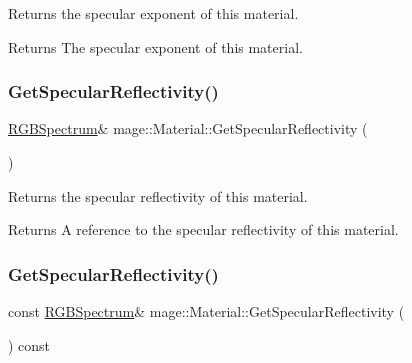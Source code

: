 Returns the specular exponent of this material.

\begin{DoxyReturn}{Returns}
The specular exponent of this material. 
\end{DoxyReturn}
\hypertarget{structmage_1_1_material_ad5fde8d972471fc99b72a4fc969883b1}{}\label{structmage_1_1_material_ad5fde8d972471fc99b72a4fc969883b1} 
\subsubsection{\texorpdfstring{Get\+Specular\+Reflectivity()}{GetSpecularReflectivity()}\hspace{0.1cm}{\footnotesize\ttfamily [1/2]}}
{\footnotesize\ttfamily \hyperlink{structmage_1_1_r_g_b_spectrum}{R\+G\+B\+Spectrum}\& mage\+::\+Material\+::\+Get\+Specular\+Reflectivity (\begin{DoxyParamCaption}{ }\end{DoxyParamCaption})\hspace{0.3cm}{\ttfamily [noexcept]}}

Returns the specular reflectivity of this material.

\begin{DoxyReturn}{Returns}
A reference to the specular reflectivity of this material. 
\end{DoxyReturn}
\hypertarget{structmage_1_1_material_a81005b5094b99b9a8d7f16bedd195718}{}\label{structmage_1_1_material_a81005b5094b99b9a8d7f16bedd195718} 
\subsubsection{\texorpdfstring{Get\+Specular\+Reflectivity()}{GetSpecularReflectivity()}\hspace{0.1cm}{\footnotesize\ttfamily [2/2]}}
{\footnotesize\ttfamily const \hyperlink{structmage_1_1_r_g_b_spectrum}{R\+G\+B\+Spectrum}\& mage\+::\+Material\+::\+Get\+Specular\+Reflectivity (\begin{DoxyParamCaption}{ }\end{DoxyParamCaption}) const\hspace{0.3cm}{\ttfamily [noexcept]}}

